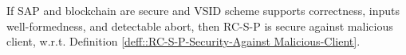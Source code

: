%  
%     
%     
   




\begin{lemma}
 If SAP and blockchain are secure and  VSID scheme supports correctness, inputs well-formedness, and detectable abort, then RC-S-P is secure against malicious client, w.r.t. Definition \ref{deff::RC-S-P-Security-Against Malicious-Client}. 
\end{lemma}


